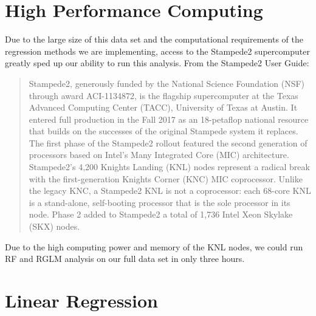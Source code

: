 \documentclass[12 pt]{uncw_thesis}
\theoremstyle{plain}
\theoremstyle{remark}
\theoremstyle{definition}
\begin{document}
\section{High Performance Computing}
Due to the large size of this data set and the computational requirements of the regression methods we are implementing, access to the Stampede2 supercomputer greatly sped up our ability to run this analysis. From the Stampede2 User Guide:
\begin{quotation}
	Stampede2, generously funded by the National Science Foundation (NSF) through award ACI-1134872, is the flagship supercomputer at the Texas Advanced Computing Center (TACC), University of Texas at Austin. It entered full production in the Fall 2017 as an 18-petaflop national resource that builds on the successes of the original Stampede system it replaces. The first phase of the Stampede2 rollout featured the second generation of processors based on Intel's Many Integrated Core (MIC) architecture. Stampede2's 4,200 Knights Landing (KNL) nodes represent a radical break with the first-generation Knights Corner (KNC) MIC coprocessor. Unlike the legacy KNC, a Stampede2 KNL is not a coprocessor: each 68-core KNL is a stand-alone, self-booting processor that is the sole processor in its node. Phase 2 added to Stampede2 a total of 1,736 Intel Xeon Skylake (SKX) nodes.\cite{Stampede}
\end{quotation}
Due to the high computing power and memory of the KNL nodes, we could run RF and RGLM analysis on our full data set in only three hours.  
\section{Linear Regression}
\end{document}
